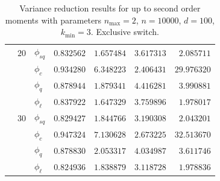 \begin{table}[htb]
{\begin{tabular}{l@{\hskip 12pt}l@{\hskip 12pt}l@{\hskip
      12pt}r@{\hskip 12pt}r@{\hskip 12pt}r@{\hskip 12pt}r}
      & $20$ &$\phi_{sq}$ &  $0.832562$ &  $1.657484$ &    $3.617313$
      &   $2.085711$ \\
      &    &$\phi_{c}$ &  $0.934280$ &  $6.348223$ &    $2.406431$ &
      $29.976320$ \\
      &    &$\phi_{q}$ &  $0.878944$ &  $1.879341$ &    $4.416281$ &
      $3.990881$ \\
      &    & $\phi_{\ell}$ &  $0.837922$ &  $1.647329$ &
      $3.759896$ &   $1.978017$ \\\cmidrule{2-7}
      & $30$ &$\phi_{sq}$ &  $0.829427$ &  $1.844766$ &    $3.190308$
      &   $2.043201$ \\
      &    &$\phi_{c}$ &  $0.947324$ &  $7.130628$ &    $2.673225$ &
      $32.513670$ \\
      &    &$\phi_{q}$ &  $0.878830$ &  $2.053317$ &    $4.034987$ &
      $3.611746$ \\
      &    & $\phi_{\ell}$ &  $0.824936$ &  $1.838879$ &
      $3.118728$ &   $1.978836$ \\
      \bottomrule
  \end{tabular}}
  \caption[Variance reduction results for up to second order
  moments]{Variance reduction results for up to second order moments
    with parameters $n_{\max}=2$, $n=\num{10000}$, $d=100$,
  $k_{\min}=3$. Exclusive switch.}
  \label{tab:eff1}
\end{table}


